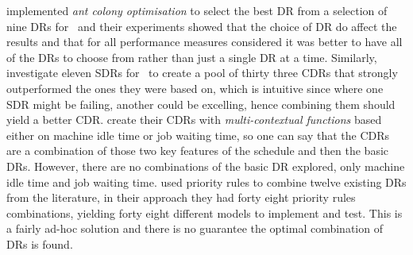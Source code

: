 \citet{Korytkowski13} implemented \emph{ant colony optimisation} to select the 
best DR from a selection of nine DRs for \JSP\ and their experiments showed 
that the choice of DR do affect the results and that for all performance 
measures considered it was better to have all of the DRs to choose from rather 
than just a single DR at a time. 
Similarly, \citet{Lu13} investigate eleven SDRs for \JSP\ to create a pool of 
thirty three CDRs that strongly outperformed the ones they were based on, which 
is intuitive since where one SDR might be failing, another could be excelling, 
hence combining them should yield a better CDR. \citeauthor{Lu13} create their 
CDRs with \emph{multi-contextual functions} based either on machine idle time 
or job waiting time, so one can say that the CDRs are a combination of those 
two key features of the schedule and then the basic DRs. However, there are no 
combinations of the basic DR explored, only machine idle time and job waiting 
time.  
\citet{Yu13} used priority rules to combine twelve existing DRs from the 
literature, in their approach they had forty eight priority rules combinations, 
yielding forty eight different models to implement and test. This is a fairly 
ad-hoc solution and there is no guarantee the optimal combination of DRs is 
found. 

